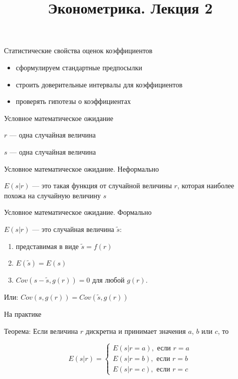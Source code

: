 \documentclass[ignorenonframetext,]{beamer}
\title{Эконометрика. Лекция 2}
\begin{document}
\frame{\titlepage}

\begin{frame}{Статистические свойства оценок коэффициентов}

\begin{itemize}
\item
  сформулируем стандартные предпосылки
\item
  строить доверительные интервалы для коэффициентов
\item
  проверять гипотезы о коэффициентах
\end{itemize}

\end{frame}

\begin{frame}{Условное математическое ожидание}

$r$ --- одна случайная величина

$s$ --- одна случайная величина

\end{frame}

\begin{frame}{Условное математическое ожидание. Неформально}

$E(s|r)$ --- это такая функция от случайной величины $r$, которая
наиболее похожа на случайную величину $s$

\end{frame}

\begin{frame}{Условное математическое ожидание. Формально}

$E(s|r)$ --- это случайная величина $\tilde{s}$:

\begin{enumerate}
\def\labelenumi{\arabic{enumi}.}
\item
  представимая в виде $\tilde{s}=f(r)$
\item
  $E(\tilde{s})=E(s)$
\item
  $Cov(s-\tilde{s},g(r))=0$ для любой $g(r)$.
\end{enumerate}

Или: $Cov(s,g(r))=Cov(\tilde{s},g(r))$

\end{frame}

\begin{frame}{На практике}

Теорема: Если величина $r$ дискретна и принимает значения $a$, $b$ или
$c$, то

\[
E(s|r)=\begin{cases}
E(s|r=a), \text{ если } r=a \\
E(s|r=b), \text{ если } r=b \\
E(s|r=c), \text{ если } r=c 
\end{cases}
\]

\end{frame}
\end{document}
